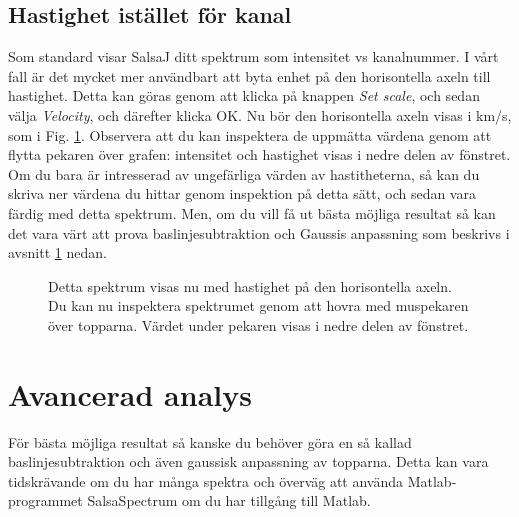 \documentclass[11pt,swedish,a4paper]{article}
\begin{document}
\subsection{Hastighet istället för kanal}
Som standard visar SalsaJ ditt spektrum som intensitet vs kanalnummer. I vårt
fall är det mycket mer användbart att byta enhet på den horisontella axeln till
hastighet. Detta kan göras genom att klicka på knappen \emph{Set scale}, 
och sedan välja \emph{Velocity}, och därefter klicka OK. 
Nu bör den horisontella axeln visas i km/s, som i Fig.
\ref{fig:velocity}. Observera att du kan inspektera de uppmätta värdena
genom att flytta pekaren över grafen: intensitet och hastighet visas i 
nedre delen av fönstret. Om du bara är intresserad av ungefärliga värden
av hastitheterna, så kan du skriva ner värdena du hittar genom inspektion
på detta sätt, och sedan vara färdig med detta spektrum. Men, om du vill få
ut bästa möjliga resultat så kan det vara värt att prova baslinjesubtraktion
och Gaussis anpassning som beskrivs i avsnitt 
\ref{sect:adv} nedan.
\begin{figure}[h!]
  \centering
  \caption{Detta spektrum visas nu med hastighet på den horisontella
	  axeln. Du kan nu inspektera spektrumet genom att hovra med muspekaren
	  över topparna. Värdet under pekaren visas i nedre delen av fönstret. 
  }
  \label{fig:velocity}
\end{figure}

\section{Avancerad analys}
\label{sect:adv}
För bästa möjliga resultat så kanske du behöver göra en så kallad
baslinjesubtraktion och även gaussisk anpassning av topparna. Detta kan vara
tidskrävande om du har många spektra och överväg att använda Matlab-programmet
SalsaSpectrum om du har tillgång till Matlab.
\end{document}
